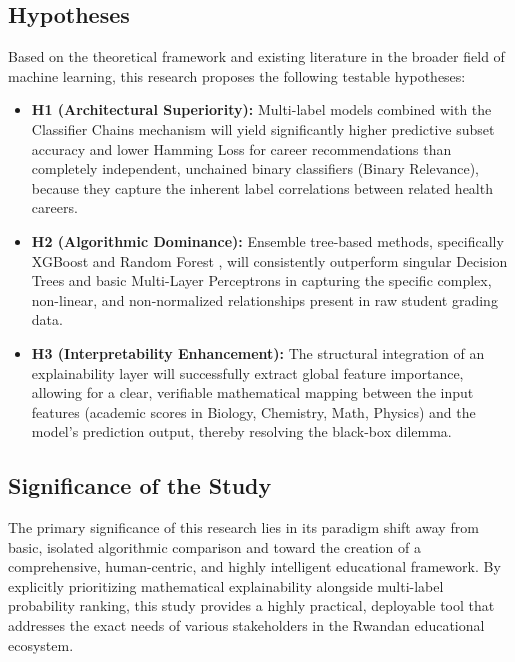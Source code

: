 \subsection{Hypotheses}

Based on the theoretical framework and existing literature in the broader field of machine learning, this research proposes the following testable hypotheses:

\begin{itemize}
    \item \textbf{H1 (Architectural Superiority):} Multi-label models combined with the Classifier Chains \parencite{read2011classifier} mechanism will yield significantly higher predictive subset accuracy and lower Hamming Loss for career recommendations than completely independent, unchained binary classifiers (Binary Relevance), because they capture the inherent label correlations between related health careers.
    \item \textbf{H2 (Algorithmic Dominance):} Ensemble tree-based methods, specifically XGBoost \parencite{chen2016xgboost} and Random Forest \parencite{breiman2001random}, will consistently outperform singular Decision Trees and basic Multi-Layer Perceptrons in capturing the specific complex, non-linear, and non-normalized relationships present in raw student grading data.
    \item \textbf{H3 (Interpretability Enhancement):} The structural integration of an explainability layer will successfully extract global feature importance, allowing for a clear, verifiable mathematical mapping between the input features (academic scores in Biology, Chemistry, Math, Physics) and the model's prediction output, thereby resolving the black-box dilemma.
\end{itemize}

\subsection{Significance of the Study}

The primary significance of this research lies in its paradigm shift away from basic, isolated algorithmic comparison and toward the creation of a comprehensive, human-centric, and highly intelligent educational framework. By explicitly prioritizing mathematical explainability alongside multi-label \parencite{tsoumakas2007multi} probability ranking, this study provides a highly practical, deployable tool that addresses the exact needs of various stakeholders in the Rwandan educational ecosystem.

